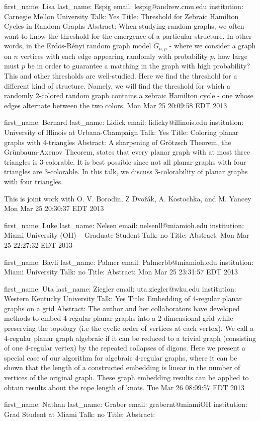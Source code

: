 \documentclass{article}
\begin{document}
first_name: Lisa
last_name: Espig
email: lespig@andrew.cmu.edu
institution: Carnegie Mellon University
Talk: Yes
Title: Threshold for Zebraic Hamilton Cycles in Random Graphs
Abstract: When studying random graphs, we often want to know the threshold for the emergence of a particular structure. In other words, in the Erd\"os-R\'enyi random graph model $G_{n,p}$ - where we consider a graph on $n$ vertices with each edge appearing randomly with probability $p$, how large must $p$ be in order to guarantee a matching in the graph with high probability? This and other thresholds are well-studied. Here we find the threshold for a different kind of structure. Namely, we will find the threshold for which a randomly 2-colored random graph contains a zebraic Hamilton cycle - one whose edges alternate between the two colors.
Mon Mar 25 20:09:58 EDT 2013

first_name: Bernard
last_name: Lidick%
email: lidicky@illinois.edu
institution: University of Illinois at Urbana-Champaign
Talk: Yes
Title: Coloring planar graphs with 4-triangles
Abstract: A sharpening of Gr\" otzsch Theorem, the Gr\" unbaum-Axenov
Theorem, states that
every planar graph with at most three triangles is 3-colorable.
It is best possible since not all planar graphs with four triangles
are 3-colorable.
In this talk, we discuss 3-colorability of planar graphs
with four triangles.

This is joint work with O. V. Borodin, Z Dvo\v{r}\'ak, A. Kostochka, and M. Yancey
Mon Mar 25 20:30:37 EDT 2013

first_name: Luke
last_name: Nelsen
email: nelsenll@miamioh.edu
institution: Miami University (OH) -- Graduate Student
Talk: no
Title:
Abstract:
Mon Mar 25 22:27:32 EDT 2013

first_name: Bayli
last_name: Palmer
email: Palmerbb@miamioh.edu
institution: Miami University
Talk: no
Title:
Abstract:
Mon Mar 25 23:31:57 EDT 2013

first_name: Uta
last_name: Ziegler
email: uta.ziegler@wku.edu
institution: Western Kentucky University
Talk: Yes
Title: Embedding of 4-regular planar graphs on a grid
Abstract: The author and her collaborators have developed methods to embed 4-regular planar graphs into a 2-dimensional grid while preserving the topology (i.e the cyclic order of vertices at each vertex). We call a 4-regular planar graph algebraic if it can be reduced to a trivial graph (consisting of one 4-regular vertex) by the repeated collapses of digons. Here we present a special case of our algorithm for algebraic 4-regular graphs, where it can be shown that the length of a constructed embedding is linear in the number of vertices of the original graph. These graph embedding results can be applied to obtain results about the rope length of knots.
Tue Mar 26 08:09:57 EDT 2013

first_name: Nathan
last_name: Graber
email: grabernt@miamiOH
institution: Grad Student at Miami
Talk: no
Title:
Abstract:
\end{document}
